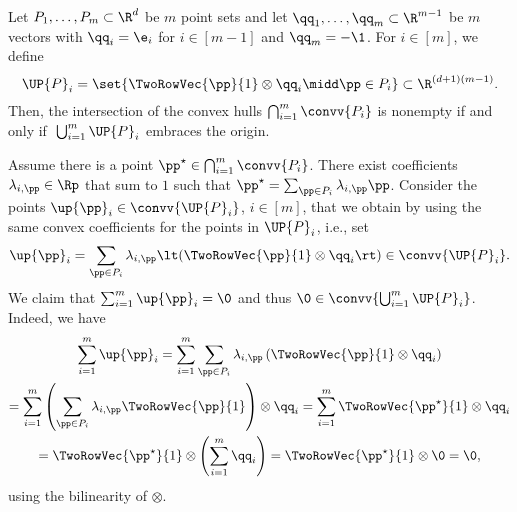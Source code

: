 \begin{lemma}
\label{lem:sarkaria}
Let $P_1,\dots,P_m \subset \R^d$ be $m$ point sets and 
let $\qq_1,\dots,\qq_{m}
\subset \R^{m-1}$ be $m$ vectors with $\qq_i = \e_i$ for $i \in [m-1]$ and
$\qq_m = -\1$. For $i \in [m]$, we define
\[
  \UP{P}_i = \set{\TwoRowVec{\pp}{1} \otimes \qq_i
  \midd \pp \in P_i}\subset \R^{(d+1) (m-1)}.
\]
Then, the intersection of the convex hulls $\bigcap_{i=1}^m \convv{P_i}$ 
is nonempty if and only if $\;\bigcup_{i=1}^m \UP{P}_i$ embraces the origin.
\end{lemma}
\begin{prf}
  Assume there is a point $\pp^\star \in \bigcap_{i=1}^m \convv{P_i}$.
  There exist coefficients
  $\lambda_{i,\pp} \in \Rp$ that sum to $1$ such that
  $\pp^\star = \sum_{\pp \in P_i} \lambda_{i,\pp}\pp$.
  Consider the points $\up{\pp}_i \in \convv{\UP{P}_i}$, $i \in [m]$, 
  that we obtain by using the same convex coefficients for the points 
  in $\UP{P}_i$, i.e., set
\[
  \up{\pp}_{i}
  = \sum_{\pp \in P_i} \lambda_{i,\pp}
          \lt(\TwoRowVec{\pp}{1} \otimes \qq_i\rt) \in \convv{\UP{P}_i}.
\]
We claim that $\sum_{i=1}^{m} \up{\pp}_i = \0$ and thus
$\0 \in \convv{\bigcup_{i=1}^{m} \UP{P}_i}$. Indeed, we have
\begin{multline*}
  \sum_{i=1}^{m} \up{\pp}_i = 
  \sum_{i=1}^{m} \sum_{\pp \in P_i} \lambda_{i,\pp}
  \left( \TwoRowVec{\pp}{1} \otimes \qq_i \right)
  \\
  = \sum_{i=1}^{m} \left( \sum_{\pp \in P_i} \lambda_{i,\pp}
  \TwoRowVec{\pp}{1} \right) \otimes \qq_i
  = \sum_{i=1}^{m} \TwoRowVec{\pp^\star}{1} \otimes \qq_i
  \\
  = \TwoRowVec{\pp^\star}{1} \otimes \left( \sum_{i=1}^{m} \qq_i \right)
  = \TwoRowVec{\pp^\star}{1} \otimes \0 = \0,
\end{multline*}
using the bilinearity of  $\otimes$.


\end{prf}
